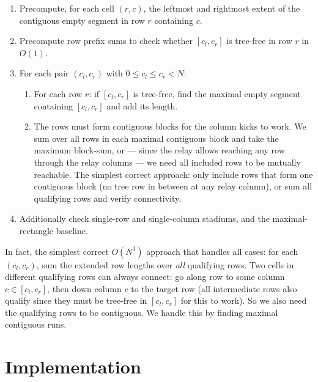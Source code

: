 \documentclass[11pt,a4paper]{article}
\begin{document}
\begin{enumerate}
  \item Precompute, for each cell $(r, c)$, the leftmost and rightmost
        extent of the contiguous empty segment in row $r$ containing $c$.
  \item Precompute row prefix sums to check whether $[c_l, c_r]$ is
        tree-free in row $r$ in $O(1)$.
  \item For each pair $(c_l, c_r)$ with $0 \le c_l \le c_r < N$:
        \begin{enumerate}
          \item For each row $r$: if $[c_l, c_r]$ is tree-free, find the
                maximal empty segment containing $[c_l, c_r]$ and add its
                length.
          \item The rows must form contiguous blocks for the column kicks
                to work.  We sum over all rows in each maximal contiguous
                block and take the maximum block-sum, or --- since the
                relay allows reaching any row through the relay columns
                --- we need all included rows to be mutually reachable.
                The simplest correct approach: only include rows that form
                one contiguous block (no tree row in between at any relay
                column), or sum all qualifying rows and verify connectivity.
        \end{enumerate}
  \item Additionally check single-row and single-column stadiums, and
        the maximal-rectangle baseline.
\end{enumerate}

In fact, the simplest correct $O(N^3)$ approach that handles all cases:
for each $(c_l, c_r)$, sum the extended row lengths over \emph{all}
qualifying rows.  Two cells in different qualifying rows can always
connect: go along row to some column $c \in [c_l, c_r]$, then down
column $c$ to the target row (all intermediate rows also qualify since
they must be tree-free in $[c_l, c_r]$ for this to work).  So we also
need the qualifying rows to be contiguous.  We handle this by finding
maximal contiguous runs.

\section{Implementation}
\end{document}
